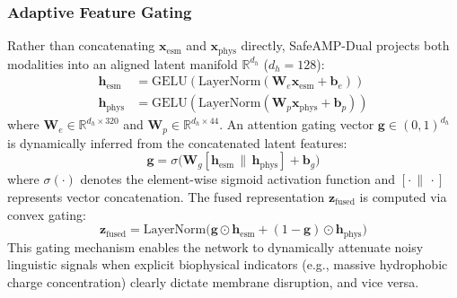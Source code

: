 \documentclass[11pt,a4paper]{article}
\begin{document}
\subsubsection{Adaptive Feature Gating}
Rather than concatenating $\mathbf{x}_{\text{esm}}$ and $\mathbf{x}_{\text{phys}}$ directly, SafeAMP-Dual projects both modalities into an aligned latent manifold $\mathbb{R}^{d_h}$ ($d_h = 128$):
\begin{align}
    \mathbf{h}_{\text{esm}} &= \text{GELU}(\text{LayerNorm}(\mathbf{W}_e \mathbf{x}_{\text{esm}} + \mathbf{b}_e)) \\
    \mathbf{h}_{\text{phys}} &= \text{GELU}(\text{LayerNorm}(\mathbf{W}_p \mathbf{x}_{\text{phys}} + \mathbf{b}_p))
\end{align}
where $\mathbf{W}_e \in \mathbb{R}^{d_h \times 320}$ and $\mathbf{W}_p \in \mathbb{R}^{d_h \times 44}$. An attention gating vector $\mathbf{g} \in (0, 1)^{d_h}$ is dynamically inferred from the concatenated latent features:
\begin{equation}
    \mathbf{g} = \sigma\big(\mathbf{W}_g [\mathbf{h}_{\text{esm}} \,\|\, \mathbf{h}_{\text{phys}}] + \mathbf{b}_g\big)
\end{equation}
where $\sigma(\cdot)$ denotes the element-wise sigmoid activation function and $[ \cdot \,\|\, \cdot ]$ represents vector concatenation. The fused representation $\mathbf{z}_{\text{fused}}$ is computed via convex gating:
\begin{equation}
    \mathbf{z}_{\text{fused}} = \text{LayerNorm}\big(\mathbf{g} \odot \mathbf{h}_{\text{esm}} + (1 - \mathbf{g}) \odot \mathbf{h}_{\text{phys}}\big)
\end{equation}
This gating mechanism enables the network to dynamically attenuate noisy linguistic signals when explicit biophysical indicators (e.g., massive hydrophobic charge concentration) clearly dictate membrane disruption, and vice versa.
\end{document}
